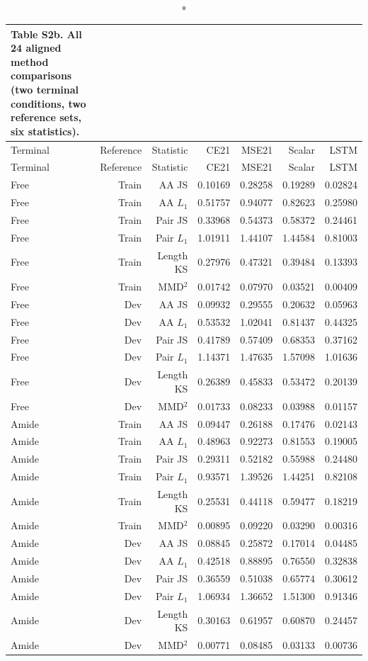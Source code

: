\begingroup\small\setlength{\tabcolsep}{4pt}\renewcommand{\arraystretch}{1.15}
\begin{longtable}{lrrrrrr}
\caption*{\textbf{Table S2b.} All 24 aligned method comparisons (two terminal conditions, two reference sets, six statistics).}\\
\toprule
Terminal & Reference & Statistic & CE21 & MSE21 & Scalar & LSTM \\
\midrule\endfirsthead
Terminal & Reference & Statistic & CE21 & MSE21 & Scalar & LSTM \\
\midrule\endhead
Free & Train & AA JS & 0.10169 & 0.28258 & 0.19289 & 0.02824 \\
Free & Train & AA $L_1$ & 0.51757 & 0.94077 & 0.82623 & 0.25980 \\
Free & Train & Pair JS & 0.33968 & 0.54373 & 0.58372 & 0.24461 \\
Free & Train & Pair $L_1$ & 1.01911 & 1.44107 & 1.44584 & 0.81003 \\
Free & Train & Length KS & 0.27976 & 0.47321 & 0.39484 & 0.13393 \\
Free & Train & MMD$^2$ & 0.01742 & 0.07970 & 0.03521 & 0.00409 \\
Free & Dev & AA JS & 0.09932 & 0.29555 & 0.20632 & 0.05963 \\
Free & Dev & AA $L_1$ & 0.53532 & 1.02041 & 0.81437 & 0.44325 \\
Free & Dev & Pair JS & 0.41789 & 0.57409 & 0.68353 & 0.37162 \\
Free & Dev & Pair $L_1$ & 1.14371 & 1.47635 & 1.57098 & 1.01636 \\
Free & Dev & Length KS & 0.26389 & 0.45833 & 0.53472 & 0.20139 \\
Free & Dev & MMD$^2$ & 0.01733 & 0.08233 & 0.03988 & 0.01157 \\
Amide & Train & AA JS & 0.09447 & 0.26188 & 0.17476 & 0.02143 \\
Amide & Train & AA $L_1$ & 0.48963 & 0.92273 & 0.81553 & 0.19005 \\
Amide & Train & Pair JS & 0.29311 & 0.52182 & 0.55988 & 0.24480 \\
Amide & Train & Pair $L_1$ & 0.93571 & 1.39526 & 1.44251 & 0.82108 \\
Amide & Train & Length KS & 0.25531 & 0.44118 & 0.59477 & 0.18219 \\
Amide & Train & MMD$^2$ & 0.00895 & 0.09220 & 0.03290 & 0.00316 \\
Amide & Dev & AA JS & 0.08845 & 0.25872 & 0.17014 & 0.04485 \\
Amide & Dev & AA $L_1$ & 0.42518 & 0.88895 & 0.76550 & 0.32838 \\
Amide & Dev & Pair JS & 0.36559 & 0.51038 & 0.65774 & 0.30612 \\
Amide & Dev & Pair $L_1$ & 1.06934 & 1.36652 & 1.51300 & 0.91346 \\
Amide & Dev & Length KS & 0.30163 & 0.61957 & 0.60870 & 0.24457 \\
Amide & Dev & MMD$^2$ & 0.00771 & 0.08485 & 0.03133 & 0.00736 \\
\bottomrule\end{longtable}\endgroup

